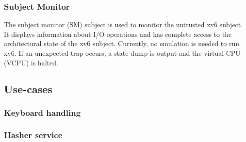 \subsubsection{Subject Monitor}
The subject monitor (SM) subject is used to monitor the untrusted xv6
subject. It displays information about I/O operations and has complete access to
the architectural state of the xv6 subject. Currently, no emulation is needed to
run xv6. If an unexpected trap occurs, a state dump is output and the virtual
CPU (VCPU) is halted.

\subsection{Use-cases}\label{subsec:use-cases}
\subsubsection{Keyboard handling}
\subsubsection{Hasher service}
